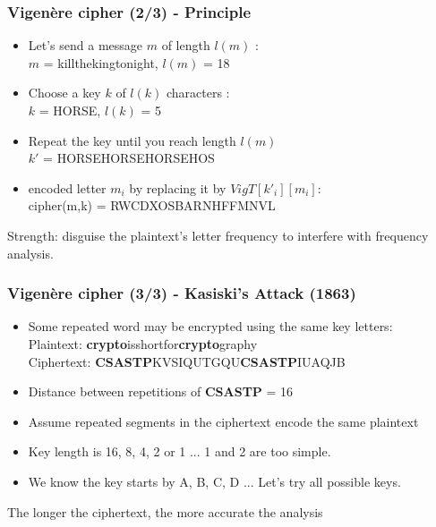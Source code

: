 \documentclass[
hyperref={pdfpagelabels=false}
,xcolor=table
]
{beamer}
\begin{document}
\begin{frame}
  \frametitle{Vigenère cipher (2/3) - Principle}
  \begin{itemize}
  \item Let's send a message $m$ of length $l(m)$ : \\
    \alert{$m$ = killthekingtonight, $l(m)$ = 18}
    \item Choose a key $k$ of $l(k)$ characters : \\
      \alert{$k$ = HORSE, $l(k)$ = 5}
    \item Repeat the key until you reach length $l(m)$ \\
      \alert{$k'$ = HORSEHORSEHORSEHOS}
    \item encoded letter $m_i$ by replacing it by $VigT[k'_i][m_i]$: \\
      \alert{cipher(m,k) = RWCDXOSBARNHFFMNVL}
    \end{itemize}

    \bigskip
    
    Strength: disguise the plaintext's letter frequency to interfere with frequency analysis.
\end{frame}


\begin{frame}
  \frametitle{Vigenère cipher (3/3) - Kasiski's Attack (1863)}
  \begin{itemize}
  \item Some repeated word may be encrypted using the same key letters:\\
    Plaintext:  \textbf{crypto}isshortfor\textbf{crypto}graphy\\
    Ciphertext: \textbf{CSASTP}KVSIQUTGQU\textbf{CSASTP}IUAQJB\\
  \item Distance between repetitions of \textbf{CSASTP} = 16
  \item Assume repeated segments in the ciphertext encode the same plaintext
  \item Key length is 16, 8, 4, 2 or 1 ... 1 and 2 are too simple. 
  \item We know the key starts by A, B, C, D ... Let's try all possible keys. 
  \end{itemize}

  \bigskip
  
  The longer the ciphertext, the more accurate the analysis
\end{frame}
\end{document}
